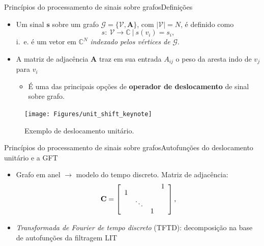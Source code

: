 \documentclass[10pt,compress]{beamer}
\begin{document}
\begin{frame}{Princ\'ipios do processamento de sinais sobre grafos}{Defini\c c\~oes}
\begin{itemize}
\item Um sinal $ \mathbf{s} $ sobre um grafo $ \mathcal{G} = \{\mathcal{V}, \mathbf{A}\} $, com $ |\mathcal{V}| = N $, \'e definido como
\begin{equation}
s: \ \mathcal{V} \rightarrow \mathbb{C} \ | \ s(v_i) = s_i,
\end{equation}
i.~e. \'e um vetor em $ \mathbb{C}^N $ \emph{indexado pelos v\'ertices de} $ \mathcal{G} $.
\item A matriz de adjac\^encia $ \mathbf{A} $ traz em sua entrada $ A_{ij} $ o peso da aresta indo de $ v_j $ para $ v_i $
\begin{itemize}
\item \'E uma das principais op\c c\~oes de \textbf{operador de deslocamento} de sinal sobre grafo.
\end{itemize}
\end{itemize}

\begin{figure}
\centering
\texttt{[image: Figures/unit\_shift\_keynote]}
\caption{Exemplo de deslocamento unit\'ario.}
\end{figure}
\end{frame}

\begin{frame}{Princ\'ipios do processamento de sinais sobre grafos}{Autofun\c c\~oes do deslocamento unit\'ario e a GFT}
\begin{itemize}
\item Grafo em anel $ \rightarrow $ modelo do tempo discreto. Matriz de adjac\^encia:
\begin{equation}\label{eq:C}
\mathbf{C} =
\left[\renewcommand{\arraystretch}{0.65}\begin{array}{cccc}
&  &  &   1\\ 
1 &  &   & \\ 
&   \ddots &  & \\ 
&  &   1 & 
\end{array}\right],
\end{equation}
\item \textit{Transformada de Fourier de tempo discreto} (TFTD): decomposi\c c\~ao na base de autofun\c c\~oes da filtragem LIT
\end{itemize}
\end{frame}
\end{document}
